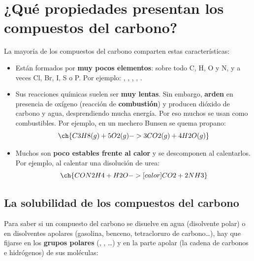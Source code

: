 \section{¿Qué propiedades presentan los compuestos del carbono?}

La mayoría de los compuestos del carbono comparten estas características:
\begin{itemize}
    \item Están formados por \textbf{muy pocos elementos}: sobre todo C, H, O y N, y a veces Cl, Br, I, S o P. Por ejemplo: , , , , .
    \item Sus reacciones químicas suelen ser \textbf{muy lentas}. Sin embargo, \textbf{arden} en presencia de oxígeno (reacción de \textbf{combustión}) y producen dióxido de carbono y agua, desprendiendo mucha energía. Por eso muchos se usan como combustibles. Por ejemplo, en un mechero Bunsen se quema propano:
    \[ \ch{C3H8 (g) + 5 O2 (g) -> 3 CO2 (g) + 4 H2O (g)} \]
    \item Muchos son \textbf{poco estables frente al calor} y se descomponen al calentarlos. Por ejemplo, al calentar una disolución de urea:
    \[ \ch{CON2H4 + H2O ->[calor] CO2 + 2 NH3} \]
\end{itemize}

\subsection{La solubilidad de los compuestos del carbono}

Para saber si un compuesto del carbono se disuelve en agua (disolvente polar) o en disolventes apolares (gasolina, benceno, tetracloruro de carbono\ldots), hay que fijarse en los \textbf{grupos polares} (, , \ldots) y en la parte apolar (la cadena de carbonos e hidrógenos) de sus moléculas:

